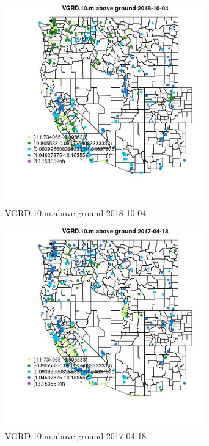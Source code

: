 \begin{figure} 
\centering  
\includegraphics[width=0.77\textwidth]{Code_Outputs/Report_ML_input_PM25_Step4_part_f_de_duplicated_aveswNAs_MapObsVGRD10maboveground2018-10-04.jpg} 
\caption{\label{fig:Report_ML_input_PM25_Step4_part_f_de_duplicated_aveswNAsMapObsVGRD10maboveground2018-10-04}VGRD.10.m.above.ground 2018-10-04} 
\end{figure} 
 

\begin{figure} 
\centering  
\includegraphics[width=0.77\textwidth]{Code_Outputs/Report_ML_input_PM25_Step4_part_f_de_duplicated_aveswNAs_MapObsVGRD10maboveground2017-04-18.jpg} 
\caption{\label{fig:Report_ML_input_PM25_Step4_part_f_de_duplicated_aveswNAsMapObsVGRD10maboveground2017-04-18}VGRD.10.m.above.ground 2017-04-18} 
\end{figure} 
 

